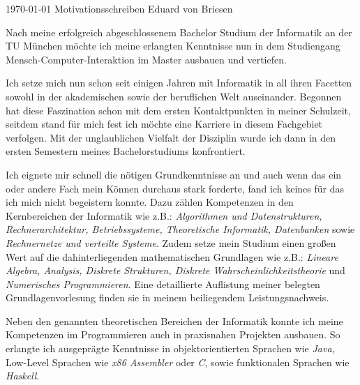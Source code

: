 \documentclass[11pt, a4paper]{awesome-cv}
\begin{document}
\makecvheader[R]

\makecvfooter
{\today}
{Motivationsschreiben}
{Eduard von Briesen}

\makelettertitle

\begin{cvletter}

  Nach meine erfolgreich abgeschlossenem Bachelor Studium der Informatik an der TU München möchte ich meine erlangten Kenntnisse nun in dem Studiengang Mensch-Computer-Interaktion im Master ausbauen und vertiefen.


  Ich setze mich nun schon seit einigen Jahren mit Informatik in all ihren Facetten sowohl in der akademischen sowie der beruflichen Welt auseinander.
  Begonnen hat diese Faszination schon mit dem ersten Kontaktpunkten in meiner Schulzeit, seitdem stand für mich fest ich möchte eine Karriere in diesem Fachgebiet verfolgen.
  Mit der unglaublichen Vielfalt der Disziplin wurde ich dann in den ersten Semestern meines Bachelorstudiums konfrontiert.


  Ich eignete mir schnell die nötigen Grundkenntnisse an und auch wenn das ein oder andere Fach mein Können durchaus stark forderte, fand ich keines für das ich mich nicht begeistern konnte.
  Dazu zählen Kompetenzen in den Kernbereichen der Informatik wie z.B.: \textit{Algorithmen und Datenstrukturen, Rechnerarchitektur, Betriebssysteme, Theoretische Informatik, Datenbanken} sowie \textit{Rechnernetze und verteilte Systeme}.
  Zudem setze mein Studium einen großen Wert auf die dahinterliegenden mathematischen Grundlagen wie z.B.: \textit{Lineare Algebra, Analysis, Diskrete Strukturen, Diskrete Wahrscheinlichkeitstheorie} und \textit{Numerisches Programmieren}.
  Eine detaillierte Auflistung meiner belegten Grundlagenvorlesung finden sie in meinem beiliegendem Leistungsnachweis.


  Neben den genannten theoretischen Bereichen der Informatik konnte ich meine Kompetenzen im Programmieren auch in praxisnahen Projekten ausbauen.
  So erlangte ich ausgeprägte Kenntnisse in objektorientierten Sprachen wie \textit{Java}, Low-Level Sprachen wie \textit{x86 Assembler} oder \textit{C}, sowie funktionalen Sprachen wie \textit{Haskell}.



\end{cvletter}
\end{document}
